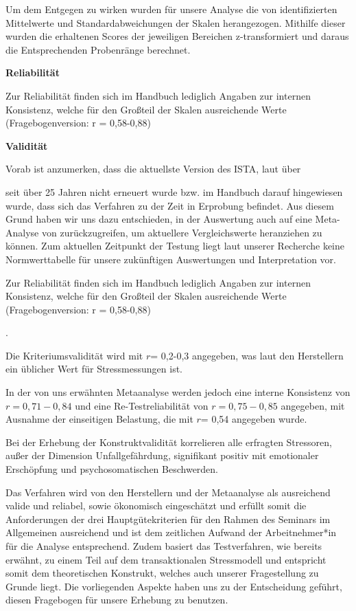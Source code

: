 \documentclass[12pt, a4paper]{article}
\begin{document}
Um dem Entgegen zu wirken wurden für unsere Analyse die von \textcite{irmerInstrumentStressOrientedTask2019} identifizierten
Mittelwerte und Standardabweichungen der Skalen herangezogen. 
Mithilfe dieser wurden die erhaltenen Scores der jeweiligen Bereichen z-transformiert und daraus die Entsprechenden 
Probenränge berechnet.

\textbf{Reliabilität}

Zur Reliabilität finden sich im Handbuch lediglich Angaben zur internen Konsistenz, 
welche für den Großteil der Skalen ausreichende Werte (Fragebogenversion: r = 0,58-0,88) 


\textbf{Validität}



Vorab ist anzumerken, dass die aktuellste Version des ISTA, laut über 

seit über 25 Jahren nicht
erneuert wurde bzw. im Handbuch darauf hingewiesen wurde, dass sich das Verfahren zu
der Zeit in Erprobung befindet.
Aus diesem Grund haben wir uns dazu entschieden, in der
Auswertung auch auf eine Meta-Analyse von \textcite{irmerInstrumentStressOrientedTask2019}
zurückzugreifen, um aktuellere Vergleichswerte heranziehen zu können. 
Zum aktuellen Zeitpunkt der Testung liegt laut unserer Recherche keine Normwerttabelle 
für unsere zukünftigen Auswertungen und Interpretation vor.

Zur Reliabilität finden sich im Handbuch lediglich Angaben zur internen Konsistenz, 
welche für den Großteil der Skalen ausreichende Werte (Fragebogenversion: r = 0,58-0,88) 

\parencite{semmerInstrumentZurStressbezogenen1999}. 

Die Kriteriumsvalidität wird mit $r$= 0,2-0,3
angegeben, was laut den Herstellern ein üblicher Wert für Stressmessungen ist.




In der von uns erwähnten Metaanalyse werden jedoch eine interne Konsistenz von 
$r = 0,71-0,84$ und eine Re-Testreliabilität von $r =0,75-0,85$ angegeben, mit Ausnahme der
einseitigen Belastung, die mit $r$= 0,54 angegeben wurde.

Bei der Erhebung der Konstruktvalidität korrelieren alle erfragten Stressoren, außer der
Dimension Unfallgefährdung, signifikant positiv mit emotionaler Erschöpfung und
psychosomatischen Beschwerden.

Das Verfahren wird von den Herstellern und der Metaanalyse als ausreichend valide und
reliabel, sowie ökonomisch eingeschätzt und erfüllt somit die Anforderungen der drei
Hauptgütekriterien für den Rahmen des Seminars im Allgemeinen ausreichend und ist dem
zeitlichen Aufwand der Arbeitnehmer*in für die Analyse entsprechend. Zudem basiert das
Testverfahren, wie bereits erwähnt, zu einem Teil auf dem transaktionalen Stressmodell und
entspricht somit dem theoretischen Konstrukt, welches auch unserer Fragestellung zu
Grunde liegt. Die vorliegenden Aspekte haben uns zu der Entscheidung geführt, diesen
Fragebogen für unsere Erhebung zu benutzen.
\end{document}
